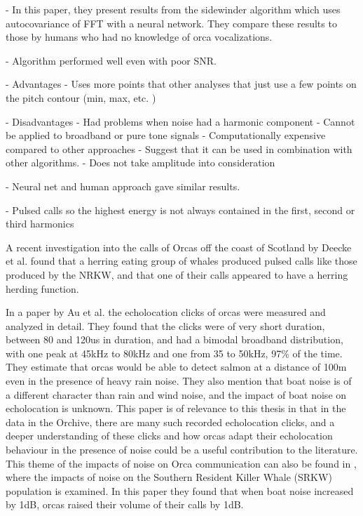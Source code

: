 \documentclass[12pt,oneside]{book}
\begin{document}
   - In this paper, they present results from the sidewinder
   algorithm which uses autocovariance of FFT with a neural network.
   They compare these results to those by humans who had no knowledge
   of orca vocalizations. 

   - Algorithm performed well even with poor SNR.  

   - Advantages
     - Uses more points that other analyses that just use a few points
       on the pitch contour (min, max, etc. \cite{au00})

   - Disadvantages
   	 - Had problems when noise had a harmonic component
   	 - Cannot be applied to broadband or pure tone signals
     - Computationally expensive compared to other approaches
     - Suggest that it can be used in combination with other algorithms.
	 - Does not take amplitude into consideration
	
   - Neural net and human approach gave similar results.

- Pulsed calls so the highest energy is not always contained in the
first, second or third harmonics \cite{watkins67}

A recent investigation into the calls of Orcas off the coast of
Scotland by Deecke et al. \cite{deecke11} found that a herring eating
group of whales produced pulsed calls like those produced by the NRKW,
and that one of their calls appeared to have a herring herding
function.

In a paper by Au et al. \cite{au04} the echolocation clicks of orcas
were measured and analyzed in detail.  They found that the clicks were
of very short duration, between 80 and 120us in duration, and had a
bimodal broadband distribution, with one peak at 45kHz to 80kHz and
one from 35 to 50kHz, 97\% of the time.  They estimate that orcas
would be able to detect salmon at a distance of 100m even in the
presence of heavy rain noise.  They also mention that boat noise is of
a different character than rain and wind noise, and the impact of boat
noise on echolocation is unknown.  This paper is of relevance to this
thesis in that in the data in the Orchive, there are many such
recorded echolocation clicks, and a deeper understanding of these
clicks and how orcas adapt their echolocation behaviour in the
presence of noise could be a useful contribution to the literature.
This theme of the impacts of noise on Orca communication can also be
found in \cite{holt09}, where the impacts of noise on the Southern
Resident Killer Whale (SRKW) population is examined.  In this paper
they found that when boat noise increased by 1dB, orcas raised their
volume of their calls by 1dB.
\end{document}
